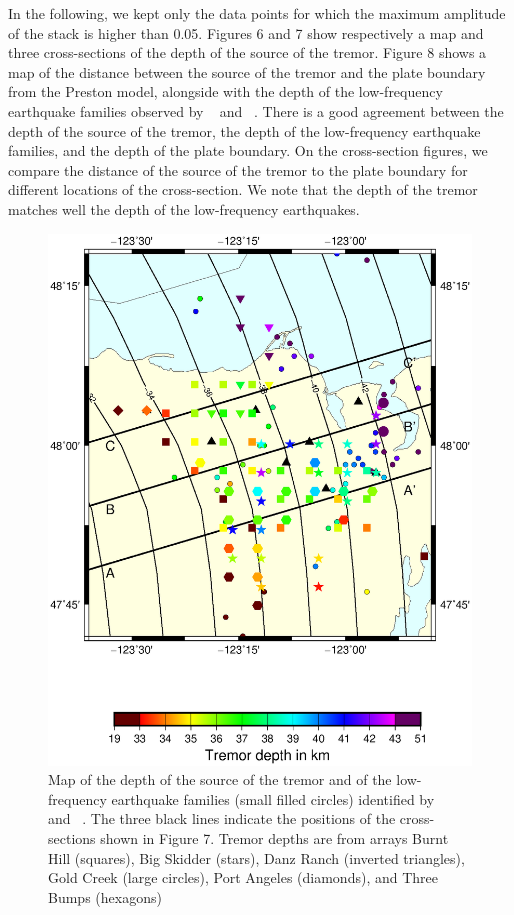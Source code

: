 \documentclass[draft]{agujournal2019}
\begin{document}
In the following, we kept only the data points for which the maximum amplitude of the stack is higher than 0.05. Figures 6 and 7 show respectively a map and three cross-sections of the depth of the source of the tremor. Figure 8 shows a map of the distance between the source of the tremor and the plate boundary from the Preston model, alongside with the depth of the low-frequency earthquake families observed by ~ and ~. There is a good agreement between the depth of the source of the tremor, the depth of the low-frequency earthquake families, and the depth of the plate boundary. On the cross-section figures, we compare the distance of the source of the tremor to the plate boundary for different locations of the cross-section. We note that the depth of the tremor matches well the depth of the low-frequency earthquakes. \\

\begin{figure}
\noindent\includegraphics[width=\textwidth, trim={1cm 5cm 3.5cm 4cm},clip]{figures/depth_PWS_PWS.eps}
\caption{Map of the depth of the source of the tremor and of the low-frequency earthquake families (small filled circles) identified by ~ and ~. The three black lines indicate the positions of the cross-sections shown in Figure 7. Tremor depths are from arrays Burnt Hill (squares), Big Skidder (stars), Danz Ranch (inverted triangles),  Gold Creek (large circles), Port Angeles (diamonds), and Three Bumps (hexagons)}
\label{pngfiguresample}
\end{figure}
\end{document}

